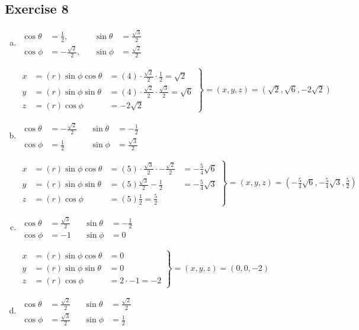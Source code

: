 \documentclass[11pt]{article}
\begin{document}
\subsection{Exercise 8}

\begin{enumerate}[a.]
	\item %
	$
	\begin{aligned}
		\cos\theta &= \frac{1}{2}, & & \sin\theta &= \frac{\sqrt{3}}{2}\\
		\cos\phi &= -\frac{\sqrt{2}}{2}, & & \sin\phi &= \frac{\sqrt{2}}{2}
	\end{aligned}
	$

	$
	\left.
	\begin{aligned}
		x &=(r)\sin\phi\cos\theta &= (4)\cdot\frac{\sqrt{2}}{2}\cdot\frac{1}{2}=\sqrt{2} \\
		y &=(r)\sin\phi\sin\theta &= (4)\cdot\frac{\sqrt{2}}{2}\cdot\frac{\sqrt{3}}{2}=\sqrt{6} \\
		z &=(r)\cos\phi &= -2\sqrt{2}
		\end{aligned}
	\right\}=(x,y,z)=(\sqrt{2},\sqrt{6},-2\sqrt{2})
	$	
	\item %
	$
	\begin{aligned}
		\cos\theta &= -\frac{\sqrt{2}}{2} & & \sin\theta &= -\frac{1}{2} \\
		\cos\phi &= \frac{1}{2} & & \sin\phi &= \frac{\sqrt{3}}{2}
	\end{aligned}
	$

	$
	\left.
	\begin{aligned}
		x &=(r)\sin\phi\cos\theta &= (5)\cdot\frac{\sqrt{3}}{2}\cdot-\frac{\sqrt{2}}{2} &= -\frac{5}{4}\sqrt{6} \\
		y &=(r)\sin\phi\sin\theta &= (5)\frac{\sqrt{3}}{2}-\frac{1}{2} &= -\frac{5}{4}\sqrt{3} \\
		z &=(r)\cos\phi &= (5)\frac{1}{2} = \frac{5}{2}
		\end{aligned}
	\right\}=(x,y,z)=(-\frac{5}{4}\sqrt{6},-\frac{5}{4}\sqrt{3},\frac{5}{2})
	$	
	\item %
	$
	\begin{aligned}
		\cos\theta &=\frac{\sqrt{3}}{2} & & \sin\theta &=-\frac{1}{2} \\
		\cos\phi &= -1 & & \sin\phi &= 0
	\end{aligned}
	$

	$
	\left.
	\begin{aligned}
		x &=(r)\sin\phi\cos\theta &= 0 \\
		y &=(r)\sin\phi\sin\theta &= 0 \\
		z &=(r)\cos\phi &= 2 \cdot -1 = -2
		\end{aligned}
	\right\}=(x,y,z)=(0,0,-2)
	$	
	\item %
	$
	\begin{aligned}
		\cos\theta &= \frac{\sqrt{2}}{2} & & \sin\theta &= \frac{\sqrt{2}}{2} \\
		\cos\phi &= \frac{\sqrt{3}}{2}& & \sin\phi &= \frac{1}{2}
	\end{aligned}
	$


\end{enumerate}
\end{document}
